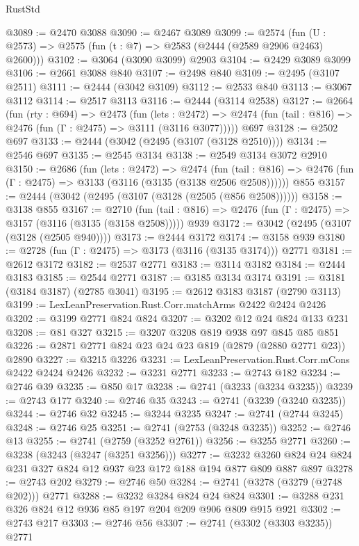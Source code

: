 \begin{lexlean}{RustStd}
\begin{coremodule}
@3089 := @2470 @3088
@3090 := @2467 @3089
@3099 := @2574 (fun (U : @2573) => @2575 (fun (t : @7) => @2583 (@2444 (@2589 @2906 @2463) @2600)))
@3102 := @3064 (@3090 @3099) @2903
@3104 := @2429 @3089 @3099
@3106 := @2661 @3088 @840
@3107 := @2498 @840
@3109 := @2495 (@3107 @2511)
@3111 := @2444 (@3042 @3109)
@3112 := @2533 @840
@3113 := @3067 @3112
@3114 := @2517 @3113
@3116 := @2444 (@3114 @2538)
@3127 := @2664
    (fun (rty : @694) =>
    @2473
      (fun (lets : @2472) =>
      @2474 (fun (tail : @816) => @2476 (fun (Γ : @2475) => @3111 (@3116 @3077)))))
    @697
@3128 := @2502 @697
@3133 := @2444 (@3042 (@2495 (@3107 (@3128 @2510))))
@3134 := @2546 @697
@3135 := @2545 @3134
@3138 := @2549 @3134 @3072 @2910
@3150 := @2686
    (fun (lets : @2472) =>
    @2474
      (fun (tail : @816) => @2476 (fun (Γ : @2475) => @3133 (@3116 (@3135 (@3138 @2506 @2508))))))
    @855
@3157 := @2444 (@3042 (@2495 (@3107 (@3128 (@2505 (@856 @2508))))))
@3158 := @3138 @855
@3167 := @2710
    (fun (tail : @816) => @2476 (fun (Γ : @2475) => @3157 (@3116 (@3135 (@3158 @2508)))))
    @939
@3172 := @3042 (@2495 (@3107 (@3128 (@2505 @940))))
@3173 := @2444 @3172
@3174 := @3158 @939
@3180 := @2728 (fun (Γ : @2475) => @3173 (@3116 (@3135 @3174))) @2771
@3181 := @2612 @3172
@3182 := @2537 @2771
@3183 := @3114 @3182
@3184 := @2444 @3183
@3185 := @2544 @2771
@3187 := @3185 @3134 @3174
@3191 := @3181 (@3184 @3187) (@2785 @3041)
@3195 := @2612 @3183 @3187 (@2790 @3113)
@3199 := LexLeanPreservation.Rust.Corr.matchArms @2422 @2424 @2426
@3202 := @3199 @2771 @824 @824
@3207 := @3202 @12 @24 @824 @133 @231
@3208 := @81 @327
@3215 := @3207 @3208 @819 @938 @97 @845 @85 @851
@3226 := @2871 @2771 @824 @23 @24 @23 @819 (@2879 (@2880 @2771 @23)) @2890
@3227 := @3215 @3226
@3231 := LexLeanPreservation.Rust.Corr.mCons @2422 @2424 @2426
@3232 := @3231 @2771
@3233 := @2743 @182
@3234 := @2746 @39
@3235 := @850 @17
@3238 := @2741 (@3233 (@3234 @3235))
@3239 := @2743 @177
@3240 := @2746 @35
@3243 := @2741 (@3239 (@3240 @3235))
@3244 := @2746 @32
@3245 := @3244 @3235
@3247 := @2741 (@2744 @3245)
@3248 := @2746 @25
@3251 := @2741 (@2753 (@3248 @3235))
@3252 := @2746 @13
@3255 := @2741 (@2759 (@3252 @2761))
@3256 := @3255 @2771
@3260 := @3238 (@3243 (@3247 (@3251 @3256)))
@3277 := @3232 @3260 @824 @24 @824 @231 @327 @824 @12 @937 @23 @172 @188 @194 @877 @809 @887 @897
@3278 := @2743 @202
@3279 := @2746 @50
@3284 := @2741 (@3278 (@3279 (@2748 @202))) @2771
@3288 := @3232 @3284 @824 @24 @824
@3301 := @3288 @231 @326 @824 @12 @936 @85 @197 @204 @209 @906 @809 @915 @921
@3302 := @2743 @217
@3303 := @2746 @56
@3307 := @2741 (@3302 (@3303 @3235)) @2771

\end{coremodule}
\end{lexlean}
